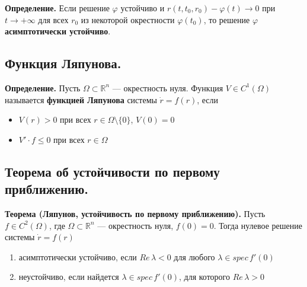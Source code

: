 \documentclass{article}
\begin{document}
\noindent \textbf{Определение.} Если решение $\varphi$ устойчиво и $r(t,t_0,r_0) - \varphi(t) \to 0$ при $t \to +\infty$ для всех $r_0$ из некоторой окрестности $\varphi(t_0)$, то решение $\varphi$ \textbf{асимптотически устойчиво}.

\subsection{Функция Ляпунова.}
\textbf{Определение.} Пусть $\Omega \subset \mathbb{R}^n$ --- окрестность нуля. Функция $V \in C^1(\Omega)$ называется \textbf{функцией Ляпунова} системы $\dot{r} = f(r)$, если
\begin{itemize}
    \item $V(r) > 0$ при всех $r \in \Omega \setminus \{0\}$, $V(0) = 0$
    \item $V' \cdot f \le 0$ при всех $r \in \Omega$
\end{itemize}

\subsection{Теорема об устойчивости по первому приближению.}
\textbf{Теорема (Ляпунов, устойчивость по первому приближению).} Пусть $f \in C^2(\Omega)$, где $\Omega \subset \mathbb{R}^n$ --- окрестность нуля, $f(0) = 0$. Тогда нулевое решение системы $\dot{r} = f(r)$
\begin{enumerate}
    \item асимптотически устойчиво, если $Re\, \lambda < 0$ для любого $\lambda \in spec\, f'(0)$
    \item неустойчиво, если найдется $\lambda \in spec\, f'(0)$, для которого $Re\, \lambda > 0$
\end{enumerate}
\end{document}
